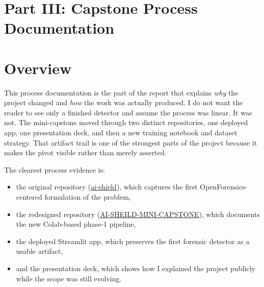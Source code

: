 \documentclass[11pt]{article}
\begin{document}
\clearpage
\section*{Part III: Capstone Process Documentation}


\section{Overview}

This process documentation is the part of the report that explains \emph{why} the project changed and \emph{how} the work was actually produced. I do not want the reader to see only a finished detector and assume the process was linear. It was not. The mini-capstone moved through two distinct repositories, one deployed app, one presentation deck, and then a new training notebook and dataset strategy. That artifact trail is one of the strongest parts of the project because it makes the pivot visible rather than merely asserted.

The clearest process evidence is:
\begin{itemize}[leftmargin=1.5em]
    \item the original repository (\href{https://github.com/Abdulrahmansoliman/ai-shield}{ai-shield}), which captures the first OpenForensics-centered formulation of the problem,
    \item the redesigned repository (\href{https://github.com/Abdulrahmansoliman/AI-SHEILD-MINI-CAPSTONE}{AI-SHEILD-MINI-CAPSTONE}), which documents the new Colab-based phase-1 pipeline,
    \item the deployed Streamlit app, which preserves the first forensic detector as a usable artifact,
    \item and the presentation deck, which shows how I explained the project publicly while the scope was still evolving.
\end{itemize}
\end{document}
